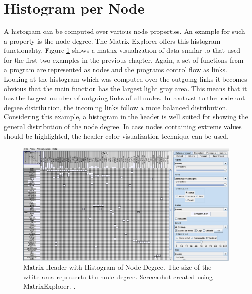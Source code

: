 \section{Histogram per Node}
\label{sec:histogram-per-node}
A histogram can be computed over various node properties. An example for such a property is the node degree. The Matrix Explorer offers this histogram functionality. Figure \ref{fig:header_matrixexplorer_histogram} shows a matrix visualization of data similar to that used for the first two examples in the previous chapter. Again, a set of functions from a program are represented as nodes and the programs control flow as links. Looking at the histogram which was computed over the outgoing links it becomes obvious that the main function has the largest light gray area. This means that it has the largest number of outgoing links of all nodes. In contrast to the node out degree distribution, the incoming links follow a more balanced distribution. Considering this example, a histogram in the header is well suited for showing the general distribution of the node degree. In case nodes containing extreme values should be highlighted, the header color visualization technique can be used.
\begin{figure}[H]
  \includegraphics[width=\textwidth]{images/Header_MatrixExplorer_histogram.png}
  \caption{Matrix Header with Histogram of Node Degree. The size of the white area represents the node degree. Screenshot created using MatrixExplorer. \citep{henry-phd-2008}. \label{fig:header_matrixexplorer_histogram}}
\end{figure}


